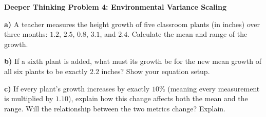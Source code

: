 \documentclass[12pt, letterpaper, fleqn]{article}
\begin{document}
\vspace{3mm}

\begin{tcolorbox}[colback=white, colframe=black, boxrule=1pt, arc=4mm, left=6mm, right=6mm, top=5mm, bottom=5mm]
\textbf{Deeper Thinking Problem 4: Environmental Variance Scaling}

\medskip

\noindent
\textbf{a)} A teacher measures the height growth of five classroom plants (in inches) over three months: $1.2$, $2.5$, $0.8$, $3.1$, and $2.4$. Calculate the mean and range of the growth.

\vspace{4.5cm}

\noindent
\textbf{b)} If a sixth plant is added, what must its growth be for the new mean growth of all six plants to be exactly $2.2$ inches? Show your equation setup.

\vspace{4.5cm}

\noindent
\textbf{c)} If every plant's growth increases by exactly $10\%$ (meaning every measurement is multiplied by $1.10$), explain how this change affects both the mean and the range. Will the relationship between the two metrics change? Explain.

\vspace{4.5cm}
\end{tcolorbox}
\end{document}
